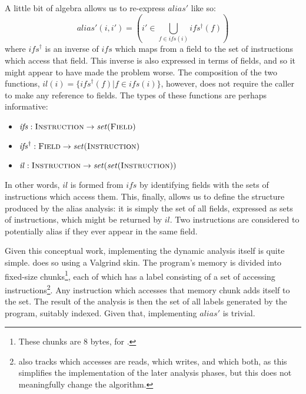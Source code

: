 {A little bit of algebra allows us to re-express $\mathit{alias}'$ like
so:
\begin{displaymath}
\mathit{alias}'(i, i') = \left(i' \in \bigcup_{f \in \mathit{ifs}(i)} \mathit{ifs^{\dagger}}(f)\right)
\end{displaymath}
where $\mathit{ifs}^{\dagger}$ is an inverse of $\mathit{ifs}$ which
maps from a field to the set of instructions which access that field.
This inverse is also expressed in terms of fields, and so it might
appear to have made the problem worse.  The composition of the two
functions, $\mathit{il}(i) = \{\mathit{ifs}^{\dagger}(f) | f \in
\mathit{ifs}(i)\}$, however, does not require the caller to make any
reference to fields.  The types of these functions are perhaps
informative:
\begin{itemize}
\item $\mathit{ifs}: \textsc{Instruction} \rightarrow \mathit{set}(\textsc{Field})$
\item $\mathit{ifs}^{\dagger}: \textsc{Field} \rightarrow \mathit{set}(\textsc{Instruction})$
\item $\mathit{il}: \textsc{Instruction} \rightarrow \mathit{set}(\mathit{set}(\textsc{Instruction}))$
\end{itemize}
In other words, $\mathit{il}$ is formed from $\mathit{ifs}$ by
identifying fields with the sets of instructions which access them.
This, finally, allows us to define the structure produced by the alias
analysis: it is simply the set of all fields, expressed as sets of
instructions, which might be returned by $\mathit{il}$.  Two
instructions are considered to potentially alias if they ever appear
in the same field.

Given this conceptual work, implementing the dynamic analysis itself
is quite simple.  {\Implementation} does so using a Valgrind skin.
The program's memory is divided into fixed-size chunks\footnote{These
  chunks are 8 bytes, for {\implementation}.}, each of which has a
label consisting of a set of accessing
instructions\footnote{{\Implementation} also tracks which accesses are
  reads, which writes, and which both, as this simplifies the
  implementation of the later analysis phases, but this does not
  meaningfully change the algorithm.}.  Any instruction which accesses
that memory chunk adds itself to the set.  The result of the analysis
is then the set of all labels generated by the program, suitably
indexed.  Given that, implementing $\mathit{alias}'$ is trivial.

}
